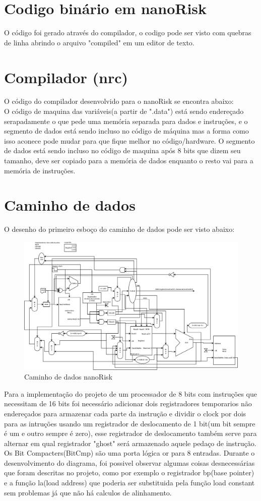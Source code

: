 \documentclass[a4paper, 10pt]{article}
\begin{document}
\section{Codigo binário  em nanoRisk}
O código foi gerado através do compilador, o codigo pode ser visto com quebras de linha abrindo o arquivo "compiled" em um editor de texto.\\

\newpage
\section{Compilador (nrc)}
O código do compilador desenvolvido para o nanoRisk se encontra abaixo:\\
O código de maquina das variáveis(a partir de ".data") está sendo endereçado serapadamente o que pede uma memória separada para dados e instruções, e o segmento de dados está sendo incluso no código de máquina mas a forma como isso aconece pode mudar para que fique melhor no código/hardware. O segmento de dados está sendo incluso no código de maquina após 8 bits que dizem seu tamanho, deve ser copiado para a memória de dados enquanto o resto vai para a memória de instruções.

\newpage
\section{Caminho de dados}
O desenho do primeiro esboço do caminho de dados pode ser visto abaixo:
\begin{figure}[H]
	\centering
	\includegraphics[scale=0.12]{nanoRiskDiagram.png}
	\caption{Caminho de dados nanoRisk}
	\label{Rotulo}
\end{figure}
Para a implementação do projeto de um processador de 8 bits com instruções que necessitam de 16 bits foi necessário adicionar dois registradores temporarios não endereçados para armazenar cada parte da instrução e dividir o clock por dois para as intruções usando um registrador de deslocamento de 1 bit(um bit sempre é um e outro sempre é zero), esse registrador de deslocamento também serve para alternar em qual registrador "ghost" será armazenado aquele pedaço de instrução. Os Bit Compacters(BitCmp) são uma porta lógica or para 8 entradas. Durante o desenvolvimento do diagrama, foi possivel observar algumas coisas desnecessárias que foram descritas no projeto, como por exemplo o registrador bp(base pointer) e a função la(load address) que poderia ser substituida pela função load constant sem problemas já que não há calculos de alinhamento.
\newpage
\end{document}
